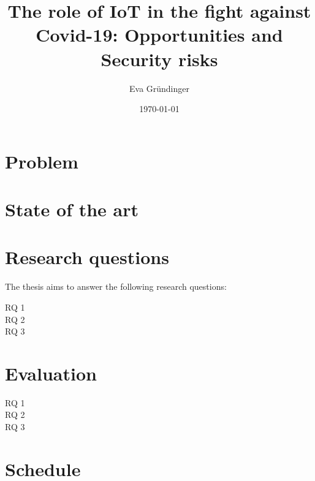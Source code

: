 \documentclass[
    numbers=noenddot,
    parskip=half-,
    fontsize=12pt,
    paper=a4,
    oneside,
    titlepage,
    bibliography=totoc,
    chapterprefix=false,
]{scrbook}
\title{The role of IoT in the fight against Covid-19: Opportunities and Security risks}
\author{Eva Gründinger}
\date{\today}
\begin{document}

    \frontmatter
    
    \tableofcontents
    \newpage


    \mainmatter

    \chapter{Problem}\label{ch:problem}    

    \chapter{State of the art}\label{ch:state-of-the-art}

    \chapter{Research questions}\label{ch:research-questions}
    The thesis aims to answer the following research questions:

    \begin{description}
        \item[RQ 1]
        \item[RQ 2] 
        \item[RQ 3] 
    \end{description}


    \chapter{Evaluation}\label{ch:evaluation}
    
    \begin{description}
        \item[RQ 1] 
        \item[RQ 2]
       	\item[RQ 3] 
    \end{description}
 
 
 	\chapter{Schedule}\label{ch:schedule}
 	
\end{document}
